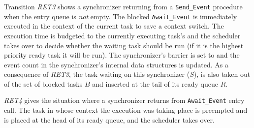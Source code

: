 Transition \emph{RET3} shows a synchronizer returning from a
\texttt{Send\_Event} procedure when the entry queue is \emph{not}
empty. The blocked \texttt{Await\_Event} is immediately executed in
the context of the current task to save a context switch. The
execution time is budgeted to the currently executing task's 
and the scheduler takes over to decide whether the waiting task should
be run (if it is the highest priority ready task it will be run). The
synchronizer's barrier is set to  and the event count in the
synchronizer's internal data structures is updated. As a consequence
of \emph{RET3}, the task waiting on this synchronizer ($S$), is also
taken out of the set of blocked tasks $B$ and inserted at the tail of
its ready queue $R$.


\emph{RET4} gives the situation where a synchronizer returns from
\texttt{Await\_Event} entry call. The task in whose context the
execution was taking place is preempted and is placed at the head of
its ready queue, and the scheduler takes over.



